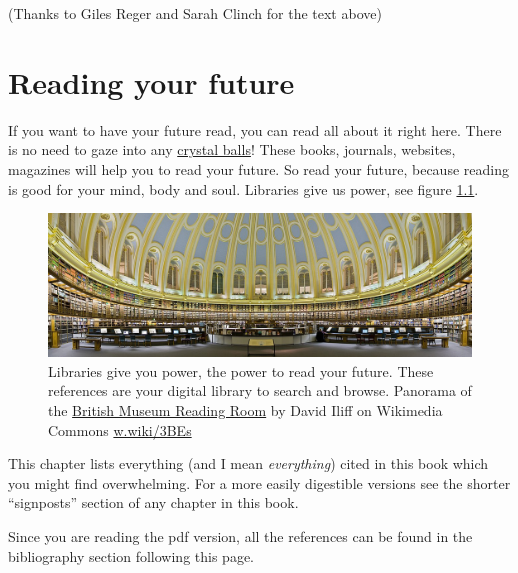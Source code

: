 \documentclass[
]{book}
\begin{document}
(Thanks to Giles Reger and Sarah Clinch for the text above)

\hypertarget{reading}{%
\chapter{Reading your future}\label{reading}}

If you want to have your future read, you can read all about it right here. There is no need to gaze into any \href{https://en.wikipedia.org/wiki/Crystal_ball}{crystal balls}! These books, journals, websites, magazines will help you to read your future. So read your future, because reading is good for your mind, body and soul. Libraries give us power, see figure \ref{fig:library-power-fig}.

\begin{figure}

{\centering \includegraphics[width=1\linewidth]{images/Libraries_Give_Us_Power} 

}

\caption{Libraries give you power, the power to read your future. These references are your digital library to search and browse. Panorama of the \href{https://en.wikipedia.org/wiki/British_Museum_Reading_Room}{British Museum Reading Room} by David Iliff on Wikimedia Commons \href{https://w.wiki/3BEs}{w.wiki/3BEs}}\label{fig:library-power-fig}
\end{figure}



This chapter lists everything (and I mean \emph{everything}) cited in this book which you might find overwhelming. For a more easily digestible versions see the shorter ``signposts'' section of any chapter in this book.

Since you are reading the pdf version, all the references can be found in the bibliography section following this page.

  
\end{document}

